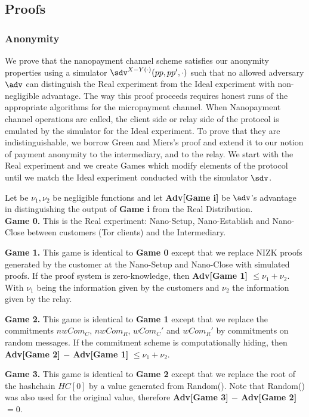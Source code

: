 \subsection{Proofs}

\subsubsection{Anonymity}

\sloppy We prove that the nanopayment channel scheme satisfies our anonymity properties using a simulator $\sdv^{X-Y(\cdot)}(pp,pp',\cdot)$ such that no allowed adversary $\adv$ can distinguish the Real experiment from the Ideal experiment with non-negligible advantage. The way this proof proceeds requires honest runs of the appropriate algorithms for the micropayment channel. When Nanopayment channel operations are called, the client side or relay side of the protocol is emulated by the simulator for the Ideal experiment. To prove that they are indistinguishable, we borrow Green and Miers's proof and extend it to our notion of payment anonymity to the intermediary, and to the relay. We start with the Real experiment and we create Games which modify elements of the protocol until we match the Ideal experiment conducted with the simulator $\sdv$.

Let be $\nu_1, \nu_2$ be negligible functions and let \textbf{Adv[Game i]} be $\adv$'s advantage in distinguishing the output of \textbf{Game i} from the Real Distribution. \\


\textbf{Game 0.} This is the Real experiment: Nano-Setup, Nano-Establish and Nano-Close between customers (Tor clients) and the Intermediary.

\textbf{Game 1.} This game is identical to \textbf{Game 0} except that we replace NIZK proofs generated by the customer at the Nano-Setup and Nano-Close with simulated proofs. If the proof system is zero-knowledge, then \textbf{Adv[Game 1] $\leq \nu_1 + \nu_2$}. With $\nu_1$ being the information given by the customers and $\nu_2$ the information given by the relay.

\textbf{Game 2.} This game is identical to \textbf{Game 1} except that we replace the commitments $nwCom_C$, $nwCom_R$, $wCom_C'$ and $wCom_R'$ by commitments on random messages. If the commitment scheme is computationally hiding, then \textbf{Adv[Game 2] $-$ Adv[Game 1]} $\leq \nu_1+\nu_2$.

\textbf{Game 3.} This game is identical to \textbf{Game 2} except that we
replace the root of the hashchain $HC[0]$ by a value generated from
Random(). Note that Random() was also used for the original value, therefore
\textbf{Adv[Game 3] $-$ Adv[Game 2]} $= 0$.

